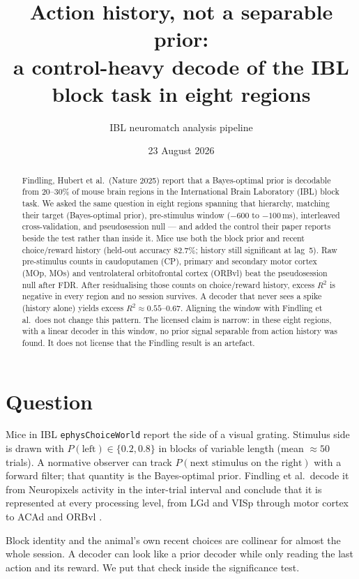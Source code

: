 \documentclass[11pt,a4paper]{article}
\title{Action history, not a separable prior:\\
a control-heavy decode of the IBL block task in eight regions}
\author{IBL neuromatch analysis pipeline}
\date{23 August 2026}
\begin{document}
\maketitle

\begin{abstract}
Findling, Hubert et al.\ (Nature 2025) report that a Bayes-optimal prior is
decodable from 20--30\% of mouse brain regions in the International Brain
Laboratory (IBL) block task. We asked the same question in eight regions
spanning that hierarchy, matching their target (Bayes-optimal prior),
pre-stimulus window ($-600$ to $-100$\,ms), interleaved cross-validation, and
pseudosession null --- and added the control their paper reports beside the
test rather than inside it. Mice use both the block prior and recent
choice/reward history (held-out accuracy $82.7\%$; history still significant
at lag~5). Raw pre-stimulus counts in caudoputamen (CP), primary and secondary
motor cortex (MOp, MOs) and ventrolateral orbitofrontal cortex (ORBvl) beat
the pseudosession null after FDR. After residualising those counts on
choice/reward history, excess $R^2$ is negative in every region and no session
survives. A decoder that never sees a spike (history alone) yields excess
$R^2 \approx 0.55$--$0.67$. Aligning the window with Findling et al.\ does not
change this pattern. The licensed claim is narrow: in these eight regions,
with a linear decoder in this window, no prior signal separable from action
history was found. It does not license that the Findling result is an
artefact.
\end{abstract}

\section{Question}

Mice in IBL \texttt{ephysChoiceWorld} report the side of a visual grating.
Stimulus side is drawn with $P(\text{left})\in\{0.2,0.8\}$ in blocks of
variable length (mean $\approx 50$ trials). A normative observer can track
$P(\text{next stimulus on the right})$ with a forward filter; that quantity is
the Bayes-optimal prior. Findling et al.\ decode it from Neuropixels activity
in the inter-trial interval and conclude that it is represented at every
processing level, from LGd and VISp through motor cortex to ACAd and ORBvl
\cite{findling2025}.

Block identity and the animal's own recent choices are collinear for almost
the whole session. A decoder can look like a prior decoder while only reading
the last action and its reward. We put that check inside the significance
test.
\end{document}
